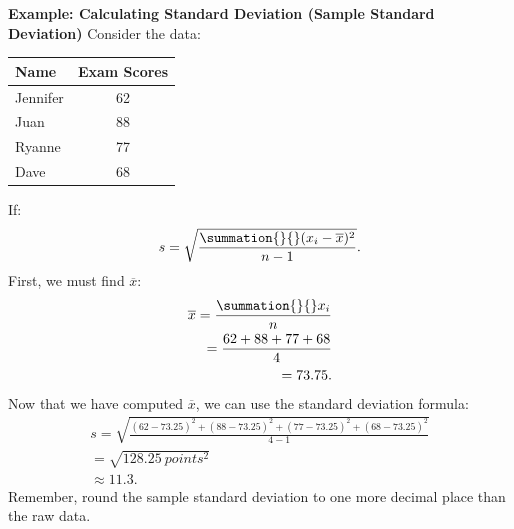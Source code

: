 \documentclass{report}
\begin{document}
        \bigbreak \noindent 
        \pagebreak \bigbreak \noindent
        \begin{mdframed}
          \textbf{Example: Calculating Standard Deviation (Sample Standard Deviation)}
          \bigbreak \noindent 
          Consider the data:
          \begin{center}
              \begin{tabular}{|l|c|}
              \hline
            Name & Exam Scores	 \\
            \hline
            Jennifer & 62 \\  	
            \hline
            Juan & 88 \\
            \hline
            Ryanne & 77 \\
            \hline 
            Dave &  68 \\
            \hline
              \end{tabular}
          \end{center}
          \bigbreak \noindent 
          If:
          \begin{align*}
              s = \sqrt{\frac{\summation{}{}(x_{i} - \overline{x})^{2}}{n-1}}
          .\end{align*}
          \bigbreak \noindent 
          First, we must find $\overline{x}$:
          \begin{align*}
              \overline{x} = \frac{\summation{}{}x_{i}}{n} \\
              = \frac{62 + 88 + 77 + 68}{4} \\
              = 73.75
          .\end{align*}
          \bigbreak \noindent 
          Now that we have computed $\overline{x}$, we can use the standard deviation formula:
          \begin{align*}
              s = \sqrt{\frac{(62-73.25)^{2} + (88-73.25)^{2} + (77-73.25)^{2} + (68-73.25)^{2}}{4-1}} \\
              = \sqrt{128.25\ points^{2}} \\
              \approx  11.3
          .\end{align*}
          \bigbreak \noindent 
          Remember, round the sample standard deviation to one more decimal place than the raw data.
        \end{mdframed}
\end{document}
